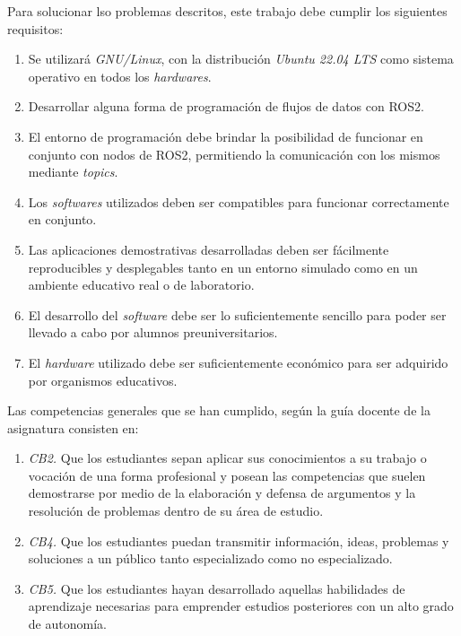 Para solucionar lso problemas descritos, este trabajo debe cumplir los
siguientes requisitos:

\begin{enumerate}
    \item{Se utilizará \textit{GNU/Linux}, con la distribución
        \textit{Ubuntu 22.04 LTS} como sistema operativo en todos los
        \textit{hardwares}.}
    \item{Desarrollar alguna forma de programación de flujos de datos con ROS2.}
    \item{El entorno de programación debe brindar la posibilidad de funcionar en
        conjunto con nodos de ROS2, permitiendo la comunicación con los mismos
        mediante \textit{topics}.}
    \item{Los \textit{softwares} utilizados deben ser compatibles para funcionar
        correctamente en conjunto.}
    \item{Las aplicaciones demostrativas desarrolladas deben ser fácilmente
        reproducibles y desplegables tanto en un entorno simulado como en un
        ambiente educativo real o de laboratorio.}
    \item{El desarrollo del \textit{software} debe ser lo suficientemente
        sencillo para poder ser llevado a cabo por alumnos preuniversitarios.}
    \item{El \textit{hardware} utilizado debe ser suficientemente económico para
        ser adquirido por organismos educativos.}
\end{enumerate}

Las competencias generales que se han cumplido, según la guía docente de la
asignatura consisten en:

\begin{enumerate}
    \item{\textit{CB2.} Que los estudiantes sepan aplicar sus conocimientos a su
        trabajo o vocación de una forma profesional y posean las competencias
        que suelen demostrarse por medio de la elaboración y defensa de
        argumentos y la resolución de problemas dentro de su área de estudio.}
    \item{\textit{CB4.} Que los estudiantes puedan transmitir información,
        ideas, problemas y soluciones a un público tanto especializado como no
        especializado.}
    \item{\textit{CB5.} Que los estudiantes hayan desarrollado aquellas
        habilidades de aprendizaje necesarias para emprender estudios
        posteriores con un alto grado de autonomía.}
\end{enumerate}

